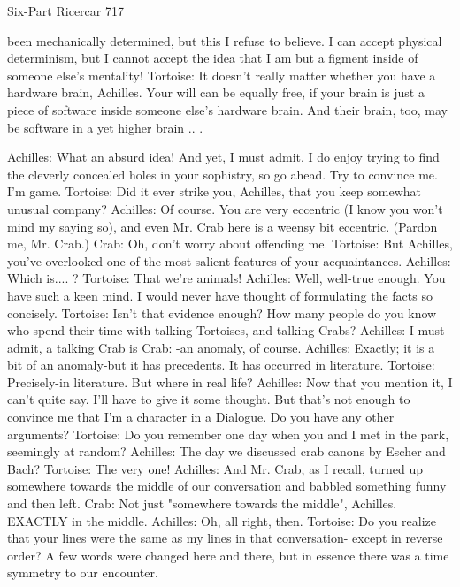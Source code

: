Six-Part Ricercar                                                                       717

   been mechanically determined, but this I refuse to believe. I can accept physical
   determinism, but I cannot accept the idea that I am but a figment inside of someone
   else's mentality!
Tortoise: It doesn't really matter whether you have a hardware brain, Achilles. Your will
   can be equally free, if your brain is just a piece of software inside someone else's
   hardware brain. And their brain, too, may be software in a yet higher brain .. .

Achilles: What an absurd idea! And yet, I must admit, I do enjoy trying to find the
   cleverly concealed holes in your sophistry, so go ahead. Try to convince me. I'm
   game.
Tortoise: Did it ever strike you, Achilles, that you keep somewhat unusual company?
Achilles: Of course. You are very eccentric (I know you won't mind my saying so), and
   even Mr. Crab here is a weensy bit eccentric. (Pardon me, Mr. Crab.)
Crab: Oh, don't worry about offending me.
Tortoise: But Achilles, you've overlooked one of the most salient features of your
   acquaintances.
Achilles: Which is.... ?
Tortoise: That we're animals!
Achilles: Well, well-true enough. You have such a keen mind. I would never have
   thought of formulating the facts so concisely.
Tortoise: Isn't that evidence enough? How many people do you know who spend their
   time with talking Tortoises, and talking Crabs? Achilles: I must admit, a talking Crab
   is
Crab: -an anomaly, of course.
Achilles: Exactly; it is a bit of an anomaly-but it has precedents. It has occurred in
   literature.
Tortoise: Precisely-in literature. But where in real life?
Achilles: Now that you mention it, I can't quite say. I'll have to give it some thought. But
   that's not enough to convince me that I'm a character in a
Dialogue. Do you have any other arguments?
Tortoise: Do you remember one day when you and I met in the park, seemingly at
   random?
Achilles: The day we discussed crab canons by Escher and Bach? Tortoise: The very one!
Achilles: And Mr. Crab, as I recall, turned up somewhere towards the middle of our
   conversation and babbled something funny and then left.
Crab: Not just "somewhere towards the middle", Achilles. EXACTLY in the middle.
Achilles: Oh, all right, then.
Tortoise: Do you realize that your lines were the same as my lines in that conversation-
   except in reverse order? A few words were changed here and there, but in essence
   there was a time symmetry to our encounter.




